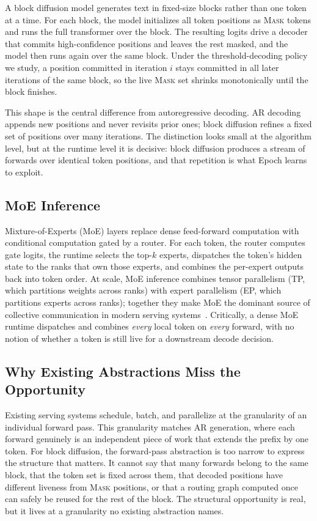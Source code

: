 \documentclass[sigconf,review,anonymous, 10pt]{acmart}
\newcommand{\sys}{Epoch}
\newcommand{\mask}{\textsc{Mask}}
\begin{document}
A block diffusion model generates text in fixed-size blocks rather than one token at a time.
For each block, the model initializes all token positions as \mask{} tokens and runs the full transformer over the block.
The resulting logits drive a decoder that commits high-confidence positions and leaves the rest masked, and the model then runs again over the same block.
Under the threshold-decoding policy we study, a position committed in iteration $i$ stays committed in all later iterations of the same block, so the live \mask{} set shrinks monotonically until the block finishes.

This shape is the central difference from autoregressive decoding.
AR decoding appends new positions and never revisits prior ones; block diffusion refines a fixed set of positions over many iterations.
The distinction looks small at the algorithm level, but at the runtime level it is decisive: block diffusion produces a stream of forwards over identical token positions, and that repetition is what \sys{} learns to exploit.

\subsection{MoE Inference}

Mixture-of-Experts (MoE) layers replace dense feed-forward computation with conditional computation gated by a router.
For each token, the router computes gate logits, the runtime selects the top-$k$ experts, dispatches the token's hidden state to the ranks that own those experts, and combines the per-expert outputs back into token order.
At scale, MoE inference combines tensor parallelism (TP, which partitions weights across ranks) with expert parallelism (EP, which partitions experts across ranks); together they make MoE the dominant source of collective communication in modern serving systems~\cite{vllm,sglang,moe}.
Critically, a dense MoE runtime dispatches and combines \emph{every} local token on \emph{every} forward, with no notion of whether a token is still live for a downstream decode decision.

\subsection{Why Existing Abstractions Miss the Opportunity}

Existing serving systems schedule, batch, and parallelize at the granularity of an individual forward pass.
This granularity matches AR generation, where each forward genuinely is an independent piece of work that extends the prefix by one token.
For block diffusion, the forward-pass abstraction is too narrow to express the structure that matters.
It cannot say that many forwards belong to the same block, that the token set is fixed across them, that decoded positions have different liveness from \mask{} positions, or that a routing graph computed once can safely be reused for the rest of the block.
The structural opportunity is real, but it lives at a granularity no existing abstraction names.
\end{document}
